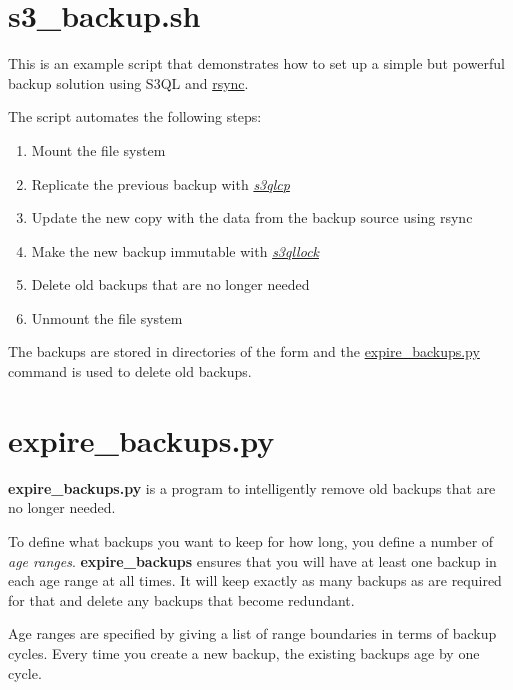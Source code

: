 \documentclass[letterpaper,10pt,english]{sphinxmanual}
\begin{document}
\section{s3\_backup.sh}
\label{contrib:s3-backup-sh}
This is an example script that demonstrates how to set up a simple but
powerful backup solution using S3QL and \href{http://samba.org/rsync}{rsync}.

The  script automates the following steps:
\begin{enumerate}
\item {} 
Mount the file system

\item {} 
Replicate the previous backup with {\hyperref[special:s3qlcp]{\emph{s3qlcp}}}

\item {} 
Update the new copy with the data from the backup source using rsync

\item {} 
Make the new backup immutable with {\hyperref[special:s3qllock]{\emph{s3qllock}}}

\item {} 
Delete old backups that are no longer needed

\item {} 
Unmount the file system

\end{enumerate}

The backups are stored in directories of the form
 and the {\hyperref[contrib:expire-backups-py]{expire\_backups.py}} command is used to
delete old backups.


\section{expire\_backups.py}
\label{contrib:expire-backups-py}
\textbf{expire\_backups.py} is a program to intelligently remove old
backups that are no longer needed.

To define what backups you want to keep for how long, you define a
number of \emph{age ranges}. \textbf{expire\_backups} ensures that you
will have at least one backup in each age range at all times. It will
keep exactly as many backups as are required for that and delete any
backups that become redundant.

Age ranges are specified by giving a list of range boundaries in terms
of backup cycles. Every time you create a new backup, the existing
backups age by one cycle.
\end{document}
